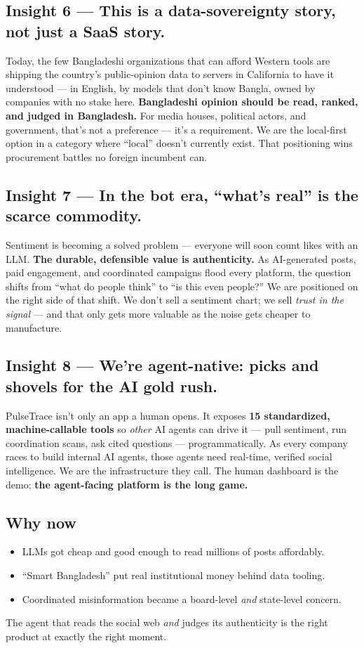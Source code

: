 \documentclass[11pt]{article}
\begin{document}
\subsection{Insight 6 — This is a data-sovereignty story, not just a SaaS story.}
Today, the few Bangladeshi organizations that can afford Western tools are shipping the
country's public-opinion data to servers in California to have it understood — in English, by
models that don't know Bangla, owned by companies with no stake here. \textbf{Bangladeshi
opinion should be read, ranked, and judged in Bangladesh.} For media houses, political actors,
and government, that's not a preference — it's a requirement. We are the local-first option in a
category where ``local'' doesn't currently exist. That positioning wins procurement battles no
foreign incumbent can.

\subsection{Insight 7 — In the bot era, ``what's real'' is the scarce commodity.}
Sentiment is becoming a solved problem — everyone will soon count likes with an LLM.
\textbf{The durable, defensible value is authenticity.} As AI-generated posts, paid engagement,
and coordinated campaigns flood every platform, the question shifts from ``what do people think''
to ``is this even people?'' We are positioned on the right side of that shift. We don't sell a
sentiment chart; we sell \emph{trust in the signal} — and that only gets more valuable as the
noise gets cheaper to manufacture.

\subsection{Insight 8 — We're agent-native: picks and shovels for the AI gold rush.}
PulseTrace isn't only an app a human opens. It exposes \textbf{15 standardized, machine-callable
tools} so \emph{other} AI agents can drive it — pull sentiment, run coordination scans, ask
cited questions — programmatically. As every company races to build internal AI agents, those
agents need real-time, verified social intelligence. We are the infrastructure they call. The
human dashboard is the demo; \textbf{the agent-facing platform is the long game.}

\subsection{Why now}
\begin{itemize}[leftmargin=1.4em,itemsep=1pt]
  \item LLMs got cheap and good enough to read millions of posts affordably.
  \item ``Smart Bangladesh'' put real institutional money behind data tooling.
  \item Coordinated misinformation became a board-level \emph{and} state-level concern.
\end{itemize}
The agent that reads the social web \emph{and} judges its authenticity is the right product at
exactly the right moment.
\end{document}
